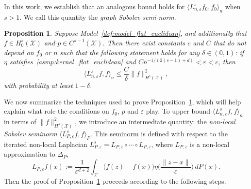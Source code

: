 \documentclass{article}
\newcommand{\1}{\mathbf{1}}
\newcommand{\mc}[1]{\mathcal{#1}}
\newcommand{\dotp}[2]{\langle #1, #2 \rangle}
\theoremstyle{alden}
\theoremstyle{aldenthm}
\newtheorem{proposition}{Proposition}
\theoremstyle{definition}
\theoremstyle{remark}
\begin{document}
In this work, we establish that an analogous bound holds for $\dotp{L_{n,\varepsilon}^sf_0}{f_0}_n$ when $s > 1$. We call this quantity the \emph{graph Sobolev semi-norm}.
\begin{proposition}
	\label{prop:graph_seminorm_ho} 
	Suppose Model~\ref{def:model_flat_euclidean}, and additionally that $f \in H_0^s(\mc{X})$ and $p \in C^{s - 1}(\mc{X})$. Then there exist constants $c$ and $C$ that do not depend on $f_0$ or $n$ such that the following statement holds for any $\delta \in (0,1)$: if $\eta$ satisfies~\ref{asmp:kernel_flat_euclidean} and $Cn^{-1/(2(s - 1) + d)} < \varepsilon < c$, then
	\begin{equation}
	\label{eqn:graph_seminorm_ho}
	\dotp{L_{n,\varepsilon}^s f}{f}_n \leq \frac{C}{\delta} \|f\|_{H^s(\mc{X})}^2 ,
	\end{equation}
	with probability at least $1 - \delta$.
\end{proposition}
We now summarize the techniques used to prove Proposition~\ref{prop:graph_seminorm_ho}, which will help explain what role the conditions on $f_0$, $p$ and $\varepsilon$ play. To upper bound $\dotp{L_{n,\varepsilon}^sf}{f}_n$ in terms of $\|f\|_{H^s(\mc{X})}^2$, we introduce an intermediate quantity: the \emph{non-local Sobolev seminorm} $\dotp{L_{P,\varepsilon}^sf}{f}_{P}$. This seminorm is defined with respect to the iterated non-local Laplacian $L_{P,\varepsilon}^s = L_{P,\varepsilon} \circ \cdots \circ L_{P,\varepsilon}$, where $L_{P,\varepsilon}$ is a non-local approximation to $\Delta_P$, 
\begin{equation}
\label{eqn:nonlocal_laplacian}
L_{P,\varepsilon}f(x) := \frac{1}{\varepsilon^{d + 2}}\int_{\mc{X}}\bigl(f(z) - f(x)\bigr) \eta\biggl(\frac{\|z - x\|}{\varepsilon}\biggr) \,dP(x).
\end{equation}
Then the proof of Proposition~\ref{prop:graph_seminorm_ho} proceeds according to the following steps.
\end{document}
